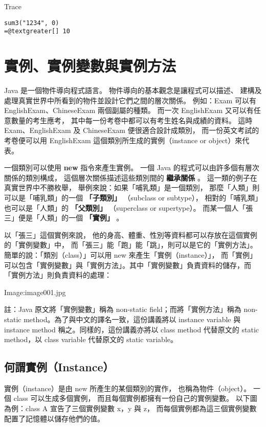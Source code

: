 \documentclass[a4paper,12pt,english]{sphinxmanual}
\begin{document}
Trace

\begin{Verbatim}[commandchars=@\[\]]
   sum3("1234", 0)
=@textgreater[] 10
\end{Verbatim}


\chapter{實例、實例變數與實例方法}
\label{java_object::doc}\label{java_object:id1}
Java 是一個物件導向程式語言。
物件導向的基本觀念是讓程式可以描述、
建構及處理真實世界中所看到的物件並設計它們之間的層次關係。
例如：Exam 可以有 EnglishExam、ChineseExam 兩個副屬的種類。
而一次 EnglishExam 又可以有任意數量的考生應考，
其中每一份考卷中都可以有考生姓名與成績的資料。
這時 Exam、EnglishExam 及 ChineseExam 便很適合設計成類別，
而一份英文考試的考卷便可以用 EnglishExam 這個類別所生成的實例（instance or object）來代表。

一個類別可以使用 \textbf{new} 指令來產生實例。
一個 Java 的程式可以由許多個有層次關係的類別構成，
這個層次關係描述這些類別間的 \textbf{繼承關係} 。
這一類的例子在真實世界中不勝枚舉，
舉例來說：如果「哺乳類」是一個類別，
那麼「人類」則可以是「哺乳類」的一個 \textbf{「子類別」} （subclass or subtype），
相對的「哺乳類」也可以是「人類」的 \textbf{「父類別」} （superclass or supertype）。
而某一個人「張三」便是「人類」的一個 \textbf{「實例」} 。

以「張三」這個實例來說，
他的身高、體重、性別等資料都可以存放在這個實例的「實例變數」中，
而「張三」能「跑」能「跳」，則可以是它的「實例方法」。
簡單的說：「類別（class）」可以用 new 來產生「實例（instance）」，
而「實例」可以包含「實例變數」與「實例方法」。其中「實例變數」負責資料的儲存，而「實例方法」則負責資料的處理：

Image:image001.jpg

註：Java 原文將「實例變數」稱為 non-static field；而將「實例方法」稱為 non-static method。為了與中文的譯名一致，這份講義將以 instance variable 與 instance method 稱之。同樣的，這份講義亦將以 class method 代替原文的 static method，以 class variable 代替原文的 static variable。


\section{何謂實例（Instance）}
\label{java_object:instance}
實例（instance）是由 new 所產生的某個類別的實作，
也稱為物件（object）。
一個 class 可以生成多個實例，
而且每個實例都擁有一份自己的實例變數。
以下圖為例：class A 宣告了三個實例變數 x，y 與 z，
而每個實例都為這三個實例變數配置了記憶體以儲存他們的值。
\end{document}
